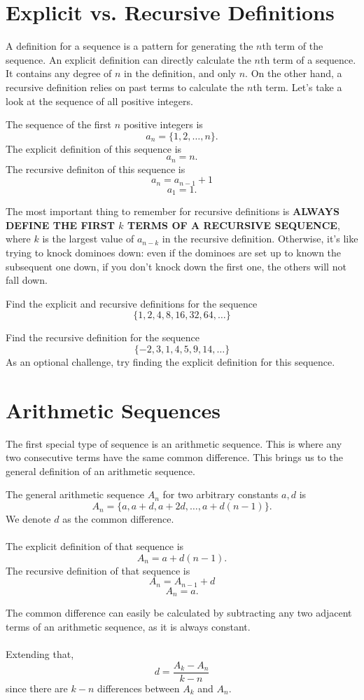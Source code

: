 \section{Explicit vs. Recursive Definitions}
A definition for a sequence is a pattern for generating the $n$th term of the sequence. An explicit definition can directly calculate the $n$th term of a sequence. It contains any degree of $n$ in the definition, and only $n$. On the other hand, a recursive definition relies on past terms to calculate the $n$th term. Let's take a look at the sequence of all positive integers.
\begin{example}
    The sequence of the first $n$ positive integers is
    \[a_n=\{1,2,\dots,n\}.\]
    The explicit definition of this sequence is
    \[a_n=n.\]
    The recursive definiton of this sequence is
    \[a_n=a_{n-1}+1\]
    \[a_1=1.\]
\end{example}
The most important thing to remember for recursive definitions is \textbf{ALWAYS DEFINE THE FIRST $k$ TERMS OF A RECURSIVE SEQUENCE}, where $k$ is the largest value of $a_{n-k}$ in the recursive definition. Otherwise, it's like trying to knock dominoes down: even if the dominoes are set up to known the subsequent one down, if you don't knock down the first one, the others will not fall down.
\begin{problem}
    Find the explicit and recursive definitions for the sequence 
    \[\{1, 2, 4, 8, 16, 32, 64,\dots\}\]
\end{problem}
\begin{problem}
    Find the recursive definition for the sequence
    \[\{-2, 3, 1, 4, 5, 9, 14,\dots\}\]
    As an optional challenge, try finding the explicit definition for this sequence.
\end{problem}



\section{Arithmetic Sequences}
The first special type of sequence is an arithmetic sequence. This is where any two consecutive terms have the same common difference. This brings us to the general definition of an arithmetic sequence.
\begin{definition}
    The general arithmetic sequence $A_n$ for two arbitrary constants $a, d$ is 
    \[A_n=\{a, a+d, a+2d, \dots, a+d(n-1)\}.\]
    We denote $d$ as the common difference.\\\\
    The explicit definition of that sequence is
    \[A_n=a+d(n-1).\]
    The recursive definition of that sequence is
    \[A_n=A_{n-1}+d\]
    \[A_n=a.\]
\end{definition}
The common difference can easily be calculated by subtracting any two adjacent terms of an arithmetic sequence, as it is always constant. \\\\
Extending that, 
\[d=\frac{A_k-A_n}{k-n}\]
since there are $k-n$ differences between $A_k$ and $A_n$.
